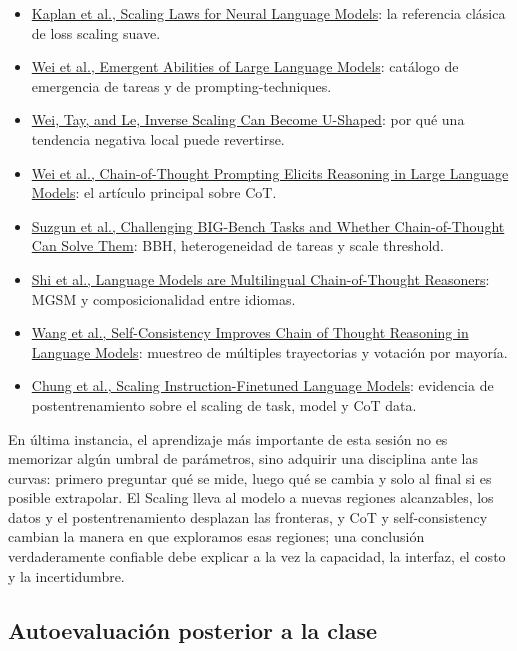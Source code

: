 \documentclass[a4paper]{article}
\begin{document}
\begin{itemize}
  \item \href{https://arxiv.org/abs/2001.08361}{Kaplan et al., Scaling Laws for Neural Language Models}: la referencia clásica de loss scaling suave.
  \item \href{https://arxiv.org/abs/2206.07682}{Wei et al., Emergent Abilities of Large Language Models}: catálogo de emergencia de tareas y de prompting-techniques.
  \item \href{https://arxiv.org/abs/2211.02011}{Wei, Tay, and Le, Inverse Scaling Can Become U-Shaped}: por qué una tendencia negativa local puede revertirse.
  \item \href{https://arxiv.org/abs/2201.11903}{Wei et al., Chain-of-Thought Prompting Elicits Reasoning in Large Language Models}: el artículo principal sobre CoT.
  \item \href{https://arxiv.org/abs/2210.09261}{Suzgun et al., Challenging BIG-Bench Tasks and Whether Chain-of-Thought Can Solve Them}: BBH, heterogeneidad de tareas y scale threshold.
  \item \href{https://arxiv.org/abs/2210.03057}{Shi et al., Language Models are Multilingual Chain-of-Thought Reasoners}: MGSM y composicionalidad entre idiomas.
  \item \href{https://arxiv.org/abs/2203.11171}{Wang et al., Self-Consistency Improves Chain of Thought Reasoning in Language Models}: muestreo de múltiples trayectorias y votación por mayoría.
  \item \href{https://arxiv.org/abs/2210.11416}{Chung et al., Scaling Instruction-Finetuned Language Models}: evidencia de postentrenamiento sobre el scaling de task, model y CoT data.
\end{itemize}

En última instancia, el aprendizaje más importante de esta sesión no es memorizar algún umbral de parámetros, sino adquirir una disciplina ante las curvas: primero preguntar qué se mide, luego qué se cambia y solo al final si es posible extrapolar. El Scaling lleva al modelo a nuevas regiones alcanzables, los datos y el postentrenamiento desplazan las fronteras, y CoT y self-consistency cambian la manera en que exploramos esas regiones; una conclusión verdaderamente confiable debe explicar a la vez la capacidad, la interfaz, el costo y la incertidumbre.

\subsection{Autoevaluación posterior a la clase}
\end{document}

